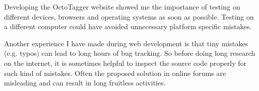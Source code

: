 Developing the OctoTagger website showed me the importance of testing on different devices, browsers and operating systems as soon as possible. Testing on a different computer could have avoided unnecessary platform specific mistakes.

Another experience I have made during web development is that tiny mistakes (e.g. typos) can lead to long hours of bug tracking. So before doing long research on the internet, it is sometimes helpful to inspect the source code properly for such kind of mistakes. Often the proposed solution in online forums are misleading and can result in long fruitless activities.


